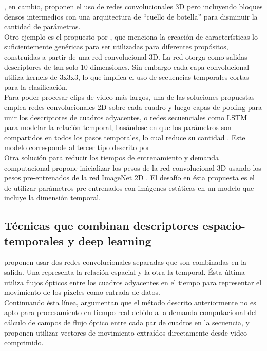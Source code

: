 \citep{Li2019}, en cambio, proponen el uso de redes convolucionales 3D pero incluyendo bloques densos intermedios con una arquitectura de “cuello de botella” para disminuir la cantidad de parámetros. \\

Otro ejemplo es el propuesto por \citep{Tran2015}, que menciona la creación de características lo suficientemente genéricas para ser utilizadas para diferentes propósitos, construidas a partir de una red convolucional 3D. La red otorga como salidas descriptores de tan solo 10 dimensiones. Sin embargo cada capa convolucional utiliza kernels de 3x3x3, lo que implica el uso de secuencias temporales cortas para la clasificación. \\

Para poder procesar clips de video más largos, una de las soluciones propuestas emplea redes convolucionales 2D sobre cada cuadro y luego capas de pooling para unir los descriptores de cuadros adyacentes, o redes secuenciales como LSTM para modelar la relación temporal, basándose en que los parámetros son compartidos en todos los pasos temporales, lo cual reduce su cantidad \citep{Ng2015}. Este modelo corresponde al tercer tipo descrito por \citep{Asadi-Aghbolaghi2017} \\

Otra solución para reducir los tiempos de entrenamiento y demanda computacional propone inicializar los pesos de la red convolucional 3D usando los pesos pre-entrenados de la red ImageNet 2D \citep{Mansimov2015}. El desafío en ésta propuesta es el de utilizar parámetros pre-entrenados con imágenes estáticas en un modelo que incluye la dimensión temporal.

\subsection{Técnicas que combinan descriptores espacio-temporales y deep learning}

\citep{Simonyan2014} proponen usar dos redes convolucionales separadas que son combinadas en la salida. Una representa la relación espacial y la otra la temporal. Ésta última utiliza flujos ópticos entre los cuadros adyacentes en el tiempo para representar el movimiento de los píxeles como entrada de datos. \\

Continuando ésta línea, \citep{Zhang2018} argumentan que el método descrito anteriormente no es apto para procesamiento en tiempo real debido a la demanda computacional del cálculo de campos de flujo óptico entre cada par de cuadros en la secuencia, y proponen utilizar vectores de movimiento extraídos directamente desde video comprimido. \\

